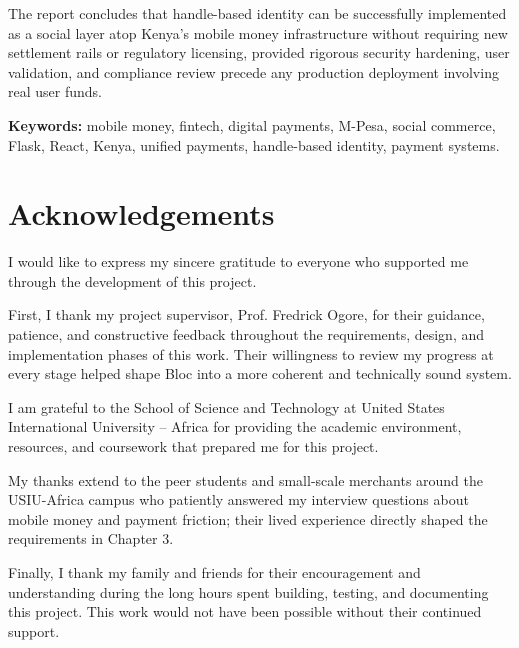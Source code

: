 \documentclass[12pt, a4paper, twoside, openright]{report}
\begin{document}
The report concludes that handle-based identity can be successfully implemented as a social layer atop Kenya's mobile money infrastructure without requiring new settlement rails or regulatory licensing, provided rigorous security hardening, user validation, and compliance review precede any production deployment involving real user funds.

\textbf{Keywords:} mobile money, fintech, digital payments, M-Pesa, social commerce, Flask, React, Kenya, unified payments, handle-based identity, payment systems.

\clearpage


\chapter*{Acknowledgements}

I would like to express my sincere gratitude to everyone who supported me through the development of this project.

First, I thank my project supervisor, Prof. Fredrick Ogore, for their guidance, patience, and constructive feedback throughout the requirements, design, and implementation phases of this work. Their willingness to review my progress at every stage helped shape Bloc into a more coherent and technically sound system.

I am grateful to the School of Science and Technology at United States International University -- Africa for providing the academic environment, resources, and coursework that prepared me for this project.

My thanks extend to the peer students and small-scale merchants around the USIU-Africa campus who patiently answered my interview questions about mobile money and payment friction; their lived experience directly shaped the requirements in Chapter 3.

Finally, I thank my family and friends for their encouragement and understanding during the long hours spent building, testing, and documenting this project. This work would not have been possible without their continued support.

\clearpage

\end{document}
